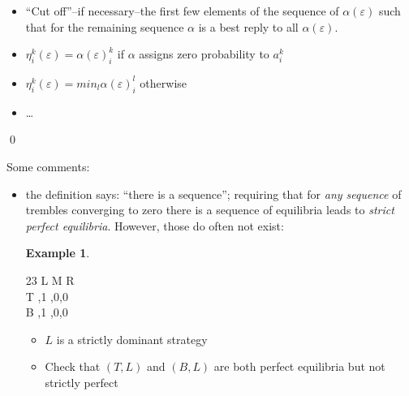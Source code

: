 \documentclass[compress]{beamer}    %
\newcommand{\Ra}{\Rightarrow}
\newcommand{\ra}{\rightarrow}
\newcommand{\less}{<}
\newcommand{\great}{>}
\theoremstyle{plain}
\theoremstyle{definition}
\newtheorem{ex}{Example}
\begin{document}
{\begin{itemize}
\begin{itemize}
  \item ``Cut off''--if necessary--the first few elements of the
    sequence of $\alpha(\varepsilon )$ such that for the remaining
    sequence $\alpha$ is a best reply to all $\alpha(\varepsilon
    )$. 
  \item $\eta_i^k(\varepsilon )=\alpha(\varepsilon )_i^k$ if $\alpha$ assigns zero probability to $a_i^k$
\item $\eta_i^k(\varepsilon )=min_l \alpha(\varepsilon )_i^l$ otherwise
  \item \dots %
  \end{itemize}
\end{itemize}
\qed

\framebreak

Some comments:
\begin{itemize}
\item the definition says: ``there is a sequence''; requiring that for \emph{any sequence}  of trembles converging to zero there is a sequence of equilibria leads to \emph{strict perfect equilibria}.  However, those do often not exist:
  \begin{ex}
     \begin{table}[h]
\centering
 \begin{game}{2}{3}
    \> L   \>M  \>  R\\%
T   ,1  ,0,0  \\
B   ,1  ,0,0
\end{game}
\caption{no strict perfect equilibrium}
\label{tab:no_strict_perf_eq}
\end{table}
\begin{itemize}
\item $L$ is a strictly dominant strategy
\item  Check that $(T,L)$ and $(B,L)$ are both perfect equilibria but not strictly perfect 
\end{itemize}
  \end{ex}


\end{itemize}}
\end{document}
